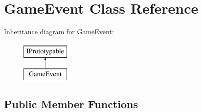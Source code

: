 \hypertarget{class_game_event}{}\section{Game\+Event Class Reference}
\label{class_game_event}
Inheritance diagram for Game\+Event\+:\begin{figure}[H]
\begin{center}
\leavevmode
\includegraphics[height=2.000000cm]{class_game_event}
\end{center}
\end{figure}
\subsection*{Public Member Functions}

